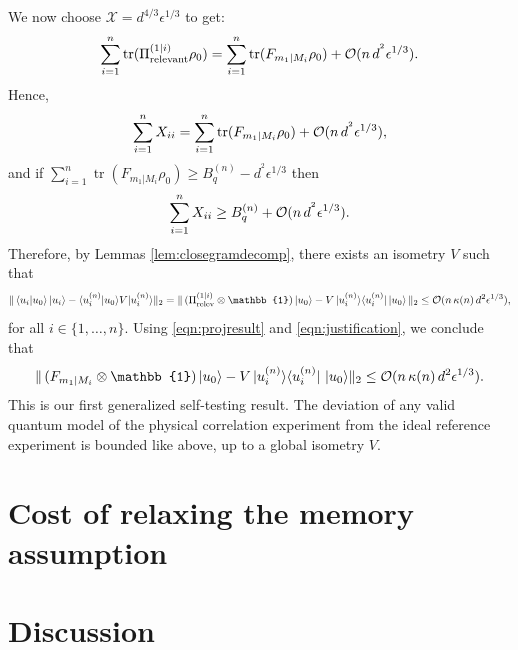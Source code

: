 We now choose $\mathcal{X}=d^{4/3}\epsilon^{1/3}$ to get:
\begin{equation*}
\sum_{i=1}^n\operatorname{tr}(\Pi_{\text{relevant}}^{(1\vert i)}\rho_0) = \sum_{i=1}^n\operatorname{tr}(F_{m_1\vert M_i}\rho_0)+\mathcal{O}(n\thinspace d^{^2}\epsilon^{1/3}).
\end{equation*}
Hence,
\begin{equation*}
\sum_{i=1}^n X_{ii} = \sum_{i=1}^n\operatorname{tr}(F_{m_1\vert M_i}\rho_0)+\mathcal{O}(n\thinspace d^{^2}\epsilon^{1/3}),
\end{equation*}
and if $\sum_{i=1}^n \operatorname{tr}(F_{m_1\vert M_i}\rho_0)\geq B_q^{(n)}-d^{^2}\epsilon^{1/3}$ then
\begin{equation*}
\sum_{i=1}^n X_{ii} \geq B_q^{(n)}+\mathcal{O}(n \thinspace d^{^2}\epsilon^{1/3}).
\end{equation*}
Therefore, by Lemmas \ref{lem:closegramdecomp}, there exists an isometry $V$ such that
\begin{equation*}
\|\bra{u_i}\ket{u_0}\ket{u_i}-\langle u_i^{(n)}\vert u_0\rangle V \vert u_i^{(n)} \rangle \|_2 = \|\thinspace(\Pi_{\text{relev}}^{(1\vert i)}\otimes \mathbb{1})\ket{u_0}-V\thinspace\vert u_i^{(n)}\rangle \langle u_i^{(n)} \vert\thinspace\vert u_0 \rangle \thinspace\|_2 \leq \mathcal{O}(n\thinspace\kappa(n)\thinspace d^2\epsilon^{1/3}),
\end{equation*}
for all $i \in \{1,\dots,n\}$.
Using \ref{eqn:projresult} and \ref{eqn:justification}, we conclude that
\begin{equation*}
\|\thinspace (F_{m_1\vert M_i}\otimes \mathbb{1})\ket{u_0}-V \thinspace\vert u_i^{(n)}\rangle \langle u_i^{(n)} \vert\thinspace\thinspace \vert u_0 \rangle \|_2 \leq \mathcal{O}(n\thinspace\kappa(n) \thinspace d^2\epsilon^{1/3}).
\end{equation*}
This is our first generalized self-testing result. The deviation of any valid quantum model of the physical correlation experiment from the ideal reference experiment is bounded like above, up to a global isometry $V$.

\section{Cost of relaxing the memory assumption}
\label{sec:relaxmemoryass}


\section{Discussion}
\label{sec:discussion}